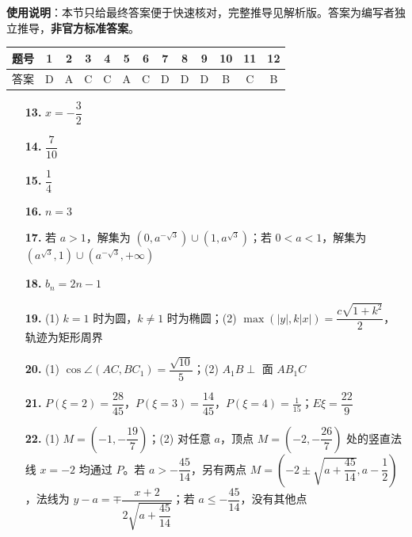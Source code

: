 
\begin{gknotice}
\textbf{使用说明}：本节只给最终答案便于快速核对，完整推导见解析版。答案为编写者独立推导，\textbf{非官方标准答案}。
\end{gknotice}

\begin{center}\begin{tabular}{ccccccccccccc}
\toprule
题号 & 1 & 2 & 3 & 4 & 5 & 6 & 7 & 8 & 9 & 10 & 11 & 12 \\
\midrule
答案 & D & A & C & C & A & C & D & D & D & B & C & B \\
\bottomrule
\end{tabular}\end{center}

\begin{itemize}[leftmargin=2.6em]
  \item[\textbf{13.}] $x=-\dfrac32$
  \item[\textbf{14.}] $\dfrac7{10}$
  \item[\textbf{15.}] $\dfrac14$
  \item[\textbf{16.}] $n=3$
\end{itemize}

\begin{itemize}[leftmargin=2.6em]
  \item[\textbf{17.}] 若 $a>1$，解集为 $(0,a^{-\sqrt3})\cup(1,a^{\sqrt3})$；若 $0<a<1$，解集为 $(a^{\sqrt3},1)\cup(a^{-\sqrt3},+\infty)$
  \item[\textbf{18.}] $b_n=2n-1$
  \item[\textbf{19.}] (1) $k=1$ 时为圆，$k\ne1$ 时为椭圆；(2) $\max(|y|,k|x|)=\dfrac{c\sqrt{1+k^2}}2$，轨迹为矩形周界
  \item[\textbf{20.}] (1) $\cos\angle(AC,BC_1)=\dfrac{\sqrt{10}}5$；(2) $A_1B\perp$ 面 $AB_1C$
  \item[\textbf{21.}] $P(\xi=2)=\dfrac{28}{45}$，$P(\xi=3)=\dfrac{14}{45}$，$P(\xi=4)=\frac{1}{15}$；$E\xi=\dfrac{22}{9}$
  \item[\textbf{22.}] (1) $M=(-1,-\dfrac{19}{7})$；(2) 对任意 $a$，顶点 $M=(-2,-\dfrac{26}{7})$ 处的竖直法线 $x=-2$ 均通过 $P$。若 $a>-\dfrac{45}{14}$，另有两点 $M=(-2\pm\sqrt{a+\dfrac{45}{14}},a-\dfrac12)$，法线为 $y-a=\mp\dfrac{x+2}{2\sqrt{a+\dfrac{45}{14}}}$；若 $a\le-\dfrac{45}{14}$，没有其他点
\end{itemize}
